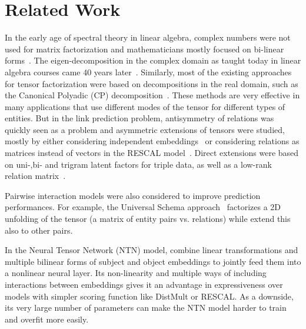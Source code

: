 \documentclass{article}
\newcommand{\Johans}[1]{\todo[inline,backgroundcolor=green!20!green]{Johans: #1}}
\begin{document}















\section{Related Work}
In the early age of spectral theory in linear algebra, complex numbers were not used 
for matrix factorization and mathematicians mostly focused on bi-linear forms~\cite{beltrami1873sulle}. 
The eigen-decomposition in the complex domain as taught today in linear algebra courses 
came 40 years later~\cite{autonne1915}. Similarly, most of the existing approaches for tensor 
factorization were based on decompositions in the real domain, such as the Canonical Polyadic (CP) decomposition~\cite{hitchcock-sum-1927}. These methods are very effective in many applications 
that use different modes of the tensor for different types of entities.
But in the link prediction problem, antisymmetry of relations was quickly seen as 
a problem and asymmetric extensions of tensors were studied, mostly by either
considering independent embeddings~\cite{sutskever2009} or considering relations as
matrices instead of vectors in the RESCAL model~\cite{Nickel2011}. 
Direct extensions were based on uni-,bi- and trigram latent factors for triple data, as well as a low-rank relation matrix~\cite{Jenatton2012}. 

Pairwise interaction models were also considered to improve prediction performances. For example, the Universal Schema approach~\cite{riedel_2013_univschema} factorizes a 2D unfolding of the tensor (a matrix of entity pairs vs. relations) while \citet{Welbl2016} extend this also to other pairs.

In the Neural Tensor Network (NTN) model, \citet{socher2013reasoning} combine linear transformations and multiple bilinear forms of subject and object embeddings to jointly feed them into a nonlinear neural layer. Its non-linearity and multiple ways of including interactions between embeddings gives it an advantage in expressiveness over models with simpler scoring function like DistMult or RESCAL. As a downside, its very large number of parameters can make the NTN model harder to train and overfit more easily.
\end{document}
